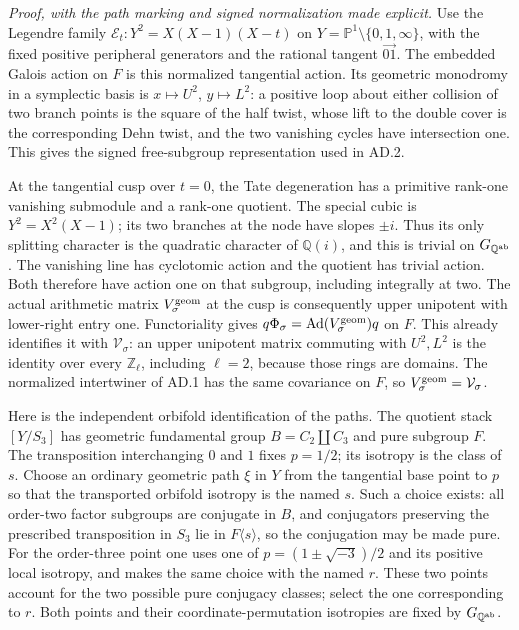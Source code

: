 \emph{Proof, with the path marking and signed normalization made explicit.}
Use the Legendre family
$\mathscr E_t:Y^2=X(X-1)(X-t)$ on
$Y=\mathbb P^1\setminus\{0,1,\infty\}$, with the fixed positive
peripheral generators and the rational tangent $\overrightarrow{01}$.
The embedded Galois action on $F$ is this normalized tangential
action.  Its geometric monodromy in a symplectic
basis is $x\mapsto U^2$, $y\mapsto L^2$: a positive loop about
either collision of two branch points is the square of the half
twist, whose lift to the double cover is the corresponding Dehn
twist, and the two vanishing cycles have intersection one.  This
gives the signed free-subgroup representation used in AD.2.

At the tangential cusp over $t=0$, the Tate degeneration has a
primitive rank-one vanishing submodule and a rank-one quotient.
The special cubic is $Y^2=X^2(X-1)$; its two branches at the
node have slopes $\pm i$.  Thus its only splitting character is
the quadratic character of $\mathbb Q(i)$, and this is trivial on
$G_{\mathbb Q^{\rm ab}}$.  The vanishing line has cyclotomic
action and the quotient has trivial action.  Both therefore have
action one on that subgroup, including integrally at two.
The actual arithmetic matrix $V^{\rm geom}_\sigma$ at the cusp
is consequently upper unipotent with lower-right entry one.
Functoriality gives
$q\Phi_\sigma=\operatorname{Ad}(V^{\rm geom}_\sigma)q$ on $F$.
This already identifies it with $\mathcal V_\sigma$: an upper
unipotent matrix commuting with $U^2,L^2$ is the identity over
every $\mathbb Z_\ell$, including $\ell=2$, because those rings
are domains.  The normalized intertwiner of AD.1 has the same
covariance on $F$, so $V^{\rm geom}_\sigma=\mathcal V_\sigma$.

Here is the independent orbifold identification of the paths.
The quotient stack $[Y/S_3]$ has geometric fundamental group
$B=C_2\amalg C_3$ and pure subgroup $F$.  The transposition
interchanging $0$ and $1$ fixes $p=1/2$; its isotropy is the
class of $s$.  Choose an ordinary geometric path $\xi$ in $Y$
from the tangential base point to $p$ so that the transported
orbifold isotropy is the named $s$.  Such a choice exists: all
order-two factor subgroups are conjugate in $B$, and conjugators
preserving the prescribed transposition in $S_3$ lie in
$F\langle s\rangle$, so the conjugation may be made pure.
For the order-three point one uses one of
$p=(1\pm\sqrt{-3})/2$ and its positive local isotropy, and makes
the same choice with the named $r$.  These two points account
for the two possible pure conjugacy classes; select the one
corresponding to $r$.  Both points and their coordinate-permutation
isotropies are fixed by $G_{\mathbb Q^{\rm ab}}$.


